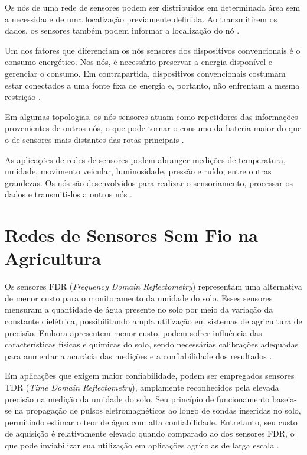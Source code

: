 \documentclass[conference]{IEEEtran}
\begin{document}
Os nós de uma rede de sensores podem ser distribuídos em determinada área sem a necessidade de uma localização previamente definida. Ao transmitirem os dados, os sensores também podem informar a localização do nó \cite{akyildiz2002}.

Um dos fatores que diferenciam os nós sensores dos dispositivos convencionais é o consumo energético. Nos nós, é necessário preservar a energia disponível e gerenciar o consumo. Em contrapartida, dispositivos convencionais costumam estar conectados a uma fonte fixa de energia e, portanto, não enfrentam a mesma restrição \cite{akyildiz2002}.

Em algumas topologias, os nós sensores atuam como repetidores das informações provenientes de outros nós, o que pode tornar o consumo da bateria maior do que o de sensores mais distantes das rotas principais \cite{akyildiz2002}.

As aplicações de redes de sensores podem abranger medições de temperatura, umidade, movimento veicular, luminosidade, pressão e ruído, entre outras grandezas. Os nós são desenvolvidos para realizar o sensoriamento, processar os dados e transmiti-los a outros nós \cite{akyildiz2002}.

\section{Redes de Sensores Sem Fio na Agricultura}

Os sensores FDR (\emph{Frequency Domain Reflectometry}) representam uma alternativa de menor custo para o monitoramento da umidade do solo. Esses sensores mensuram a quantidade de água presente no solo por meio da variação da constante dielétrica, possibilitando ampla utilização em sistemas de agricultura de precisão. Embora apresentem menor custo, podem sofrer influência das características físicas e químicas do solo, sendo necessárias calibrações adequadas para aumentar a acurácia das medições e a confiabilidade dos resultados \cite{hardie2020}.

Em aplicações que exigem maior confiabilidade, podem ser empregados sensores TDR (\emph{Time Domain Reflectometry}), amplamente reconhecidos pela elevada precisão na medição da umidade do solo. Seu princípio de funcionamento baseia-se na propagação de pulsos eletromagnéticos ao longo de sondas inseridas no solo, permitindo estimar o teor de água com alta confiabilidade. Entretanto, seu custo de aquisição é relativamente elevado quando comparado ao dos sensores FDR, o que pode inviabilizar sua utilização em aplicações agrícolas de larga escala \cite{hardie2020}.
\end{document}
